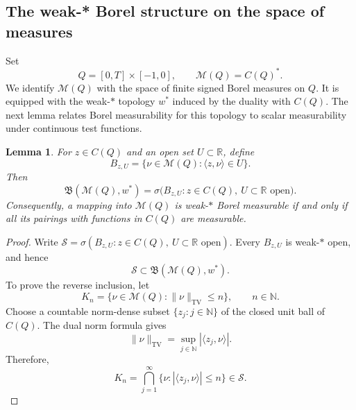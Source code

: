 \documentclass[reqno]{amsart}
\theoremstyle{plain}
\newtheorem{lemma}{Lemma}[section]
\numberwithin{equation}{section}
\numberwithin{definition}{section}
\begin{document}
{\subsection{The weak-* Borel structure on the space of measures}
Set
\begin{equation*}
    Q=[0,T]\times[-1,0],
    \qquad
    \mathcal M(Q)=C(Q)^*.
\end{equation*}
We identify $\mathcal M(Q)$ with the space of finite signed
Borel measures on $Q$. It is equipped with the weak-$*$
topology $w^*$ induced by the duality with $C(Q)$. The next lemma relates Borel measurability for this topology
to scalar measurability under continuous test functions.

\begin{lemma}\label{lem:measure-Borel}
For $z\in C(Q)$ and an open set $U\subset\mathbb R$,
define
\begin{equation*}
    B_{z,U}
    =
    \{\nu\in\mathcal M(Q):\langle z,\nu\rangle\in U\}.
\end{equation*}
Then
\begin{equation*}
    \mathfrak B(\mathcal M(Q),w^*)
    =
    \sigma\bigl(
        B_{z,U}:
        z\in C(Q),\
        U\subset\mathbb R\text{ open}
    \bigr).
\end{equation*}
Consequently, a mapping into $\mathcal M(Q)$ is
weak-$*$ Borel measurable if and only if all its pairings
with functions in $C(Q)$ are measurable.
\end{lemma}

\begin{proof}
Write $\mathcal S
    =
    \sigma(
        B_{z,U}:
        z\in C(Q),\
        U\subset\mathbb R\text{ open}
    )$.  Every $B_{z,U}$ is weak-$*$ open, and hence
\begin{equation*}
    \mathcal S
    \subset
    \mathfrak B(\mathcal M(Q),w^*).
\end{equation*}
To prove the reverse inclusion, let
\begin{equation*}
    K_n
    =
    \{\nu\in\mathcal M(Q):\|\nu\|_{\mathrm{TV}}\le n\},
    \qquad n\in\mathbb N.
\end{equation*}
Choose a countable norm-dense subset $\{z_j:j\in\mathbb N\}$
of the closed unit ball of $C(Q)$.
The dual norm formula gives
\begin{equation*}
    \|\nu\|_{\mathrm{TV}}
    =
    \sup_{j\in\mathbb N}|\langle z_j,\nu\rangle|.
\end{equation*}
Therefore,
\begin{equation*}
    K_n
    =
    \bigcap_{j=1}^{\infty}
    \{\nu:|\langle z_j,\nu\rangle|\le n\}
    \in\mathcal S.
\end{equation*}


\end{proof}}
\end{document}
